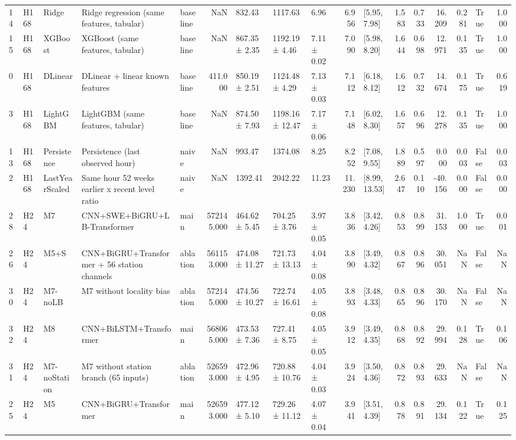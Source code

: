 \begin{tabular}{lllllrlllrlrrrrlr}
14 & H168 & Ridge & Ridge regression (same features, tabular) & baseline & NaN & 832.43 & 1117.63 & 6.96 & 6.956 & [5.95, 7.98] & 1.583 & 0.733 & 16.209 & 0.281 & True & 1.000 \\
15 & H168 & XGBoost & XGBoost (same features, tabular) & baseline & NaN & 867.35 ± 2.35 & 1192.19 ± 4.46 & 7.11 ± 0.02 & 7.090 & [5.98, 8.20] & 1.644 & 0.698 & 12.971 & 0.135 & True & 1.000 \\
0 & H168 & DLinear & DLinear + linear known features & baseline & 411.000 & 850.19 ± 2.51 & 1124.48 ± 4.29 & 7.13 ± 0.03 & 7.112 & [6.18, 8.12] & 1.612 & 0.732 & 14.674 & 0.175 & True & 0.619 \\
3 & H168 & LightGBM & LightGBM (same features, tabular) & baseline & NaN & 874.50 ± 7.93 & 1198.16 ± 12.47 & 7.17 ± 0.06 & 7.148 & [6.02, 8.30] & 1.657 & 0.696 & 12.278 & 0.135 & True & 1.000 \\
13 & H168 & Persistence & Persistence (last observed hour) & naive & NaN & 993.47 & 1374.08 & 8.25 & 8.252 & [7.08, 9.55] & 1.889 & 0.597 & 0.000 & 0.003 & False & 0.003 \\
2 & H168 & LastYearScaled & Same hour 52 weeks earlier x recent level ratio & naive & NaN & 1392.41 & 2042.22 & 11.23 & 11.230 & [8.99, 13.53] & 2.647 & 0.110 & -40.156 & 0.000 & False & 0.000 \\
28 & H24 & M7 & CNN+SWE+BiGRU+LB-Transformer & main & 572145.000 & 464.62 ± 5.45 & 704.25 ± 3.76 & 3.97 ± 0.05 & 3.836 & [3.42, 4.26] & 0.853 & 0.899 & 31.153 & 1.000 & True & 0.001 \\
26 & H24 & M5+S & CNN+BiGRU+Transformer + 56 station channels & ablation & 561153.000 & 474.08 ± 11.27 & 721.73 ± 13.13 & 4.04 ± 0.08 & 3.890 & [3.49, 4.32] & 0.867 & 0.896 & 30.051 & NaN & False & NaN \\
30 & H24 & M7-noLB & M7 without locality bias & ablation & 572145.000 & 474.56 ± 10.27 & 722.74 ± 16.61 & 4.05 ± 0.08 & 3.893 & [3.48, 4.33] & 0.865 & 0.896 & 30.170 & NaN & False & NaN \\
32 & H24 & M8 & CNN+BiLSTM+Transformer & main & 568065.000 & 473.53 ± 7.36 & 727.41 ± 8.75 & 4.05 ± 0.05 & 3.912 & [3.49, 4.35] & 0.868 & 0.892 & 29.994 & 0.128 & True & 0.106 \\
31 & H24 & M7-noStation & M7 without station branch (65 inputs) & ablation & 526593.000 & 472.96 ± 4.95 & 720.88 ± 10.76 & 4.04 ± 0.03 & 3.924 & [3.50, 4.36] & 0.872 & 0.893 & 29.633 & NaN & False & NaN \\
25 & H24 & M5 & CNN+BiGRU+Transformer & main & 526593.000 & 477.12 ± 5.10 & 729.26 ± 11.12 & 4.07 ± 0.04 & 3.941 & [3.51, 4.39] & 0.878 & 0.891 & 29.134 & 0.122 & True & 0.125 \\

\end{tabular}
